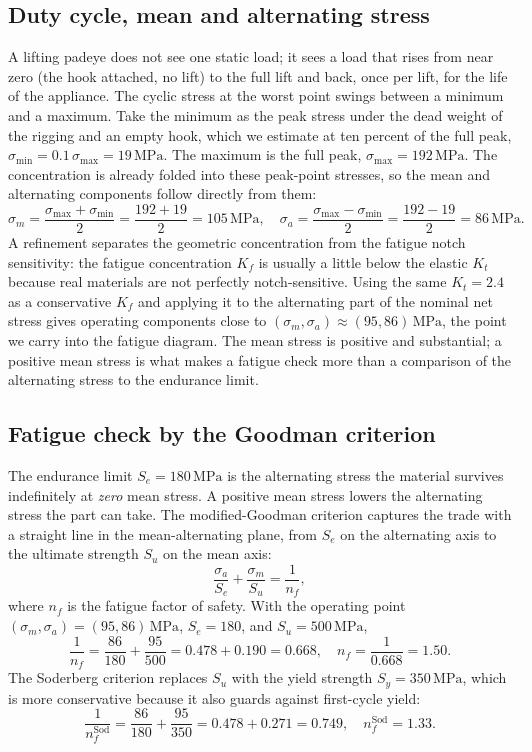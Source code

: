 \subsection{Duty cycle, mean and alternating stress}

A lifting padeye does not see one static load; it sees a load that
rises from near zero (the hook attached, no lift) to the full lift and
back, once per lift, for the life of the appliance. The cyclic stress
at the worst point swings between a minimum and a maximum. Take the
minimum as the peak stress under the dead weight of the rigging and an
empty hook, which we estimate at ten percent of the full peak,
$\sigma_{\min} = 0.1\,\sigma_{\max} = 19\,\text{MPa}$. The maximum is
the full peak, $\sigma_{\max} = 192\,\text{MPa}$. The concentration is
already folded into these peak-point stresses, so the mean and
alternating components follow directly from them:
\[
\sigma_m = \frac{\sigma_{\max} + \sigma_{\min}}{2} = \frac{192 + 19}{2}
= 105\,\text{MPa}, \quad
\sigma_a = \frac{\sigma_{\max} - \sigma_{\min}}{2} = \frac{192 - 19}{2}
= 86\,\text{MPa}.
\]
A refinement separates the geometric concentration from the fatigue
notch sensitivity: the fatigue concentration $K_f$ is usually a little
below the elastic $K_t$ because real materials are not perfectly
notch-sensitive. Using the same $K_t = 2.4$ as a conservative $K_f$ and
applying it to the alternating part of the nominal net stress gives
operating components close to $(\sigma_m, \sigma_a) \approx (95, 86)\,
\text{MPa}$, the point we carry into the fatigue diagram. The mean
stress is positive and substantial; a positive mean stress is what
makes a fatigue check more than a comparison of the alternating stress
to the endurance limit.

\subsection{Fatigue check by the Goodman criterion}

The endurance limit $S_e = 180\,\text{MPa}$ is the alternating stress
the material survives indefinitely at \emph{zero} mean stress. A
positive mean stress lowers the alternating stress the part can take.
The modified-Goodman criterion captures the trade with a straight line
in the mean-alternating plane, from $S_e$ on the alternating axis to
the ultimate strength $S_u$ on the mean axis:
\[
\frac{\sigma_a}{S_e} + \frac{\sigma_m}{S_u} = \frac{1}{n_f},
\]
where $n_f$ is the fatigue factor of safety. With the operating point
$(\sigma_m, \sigma_a) = (95, 86)\,\text{MPa}$, $S_e = 180$, and $S_u =
500\,\text{MPa}$,
\[
\frac{1}{n_f} = \frac{86}{180} + \frac{95}{500} = 0.478 + 0.190 =
0.668, \quad n_f = \frac{1}{0.668} = 1.50.
\]
The Soderberg criterion replaces $S_u$ with the yield strength $S_y =
350\,\text{MPa}$, which is more conservative because it also guards
against first-cycle yield:
\[
\frac{1}{n_f^{\text{Sod}}} = \frac{86}{180} + \frac{95}{350} = 0.478 +
0.271 = 0.749, \quad n_f^{\text{Sod}} = 1.33.
\]


